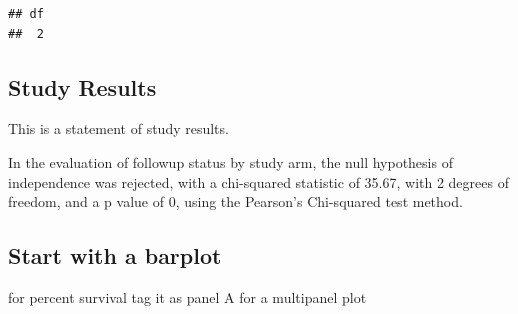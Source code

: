 \documentclass[
]{book}
\begin{document}
\begin{verbatim}
## df 
##  2
\end{verbatim}

\hypertarget{study-results}{%
\subsection{Study Results}\label{study-results}}

This is a statement of study results.

In the evaluation of followup status by study arm, the null hypothesis of independence was rejected, with a chi-squared statistic of 35.67, with 2 degrees of freedom, and a p value of 0, using the Pearson's Chi-squared test method.

\hypertarget{start-with-a-barplot}{%
\subsection{Start with a barplot}\label{start-with-a-barplot}}

for percent survival
tag it as panel A for a multipanel plot
\end{document}
